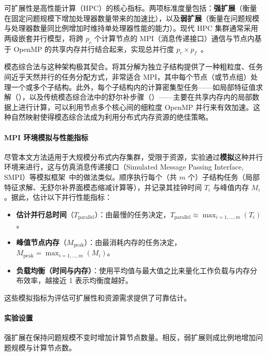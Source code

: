 可扩展性是高性能计算（HPC）的核心指标。两项标准度量包括：\textbf{强扩展}（衡量在固定问题规模下增加处理器数量带来的加速比）\cite{Rodgers1985Improvements}，以及\textbf{弱扩展}（衡量在问题规模与处理器数量同比例增加时维持单处理器性能的能力）\cite{Gustafson1988Reevaluating, McCool2012Performance}。现代 HPC 集群通常采用两级嵌套并行模型，将跨 $p_c$ 个计算节点的 MPI（消息传递接口）通信与节点内基于 OpenMP 的共享内存并行结合起来，实现总并行度 $p_c \times p_f$~\cite{2010LiHybridMPI/OpenMPPpower-awareCcomputing, rabenseifner2009hybrid, Jammer2022Towards, Cappello2000MPI}。

模态综合法与这种架构极其契合。将其分解为独立子结构提供了一种粗粒度、任务间近乎天然并行的任务分配方式，非常适合 MPI，其中每个节点（或节点组）处理一个或多个子结构。此外，每个子结构内的计算密集型任务——如局部特征值求解（），以及传统模态综合法中的舒尔补步骤（）——主要在共享内存内的局部数据上进行计算，可以利用节点多个核心间的细粒度 OpenMP 并行来有效加速。这种自然映射使得模态综合法成为利用分布式内存资源的绝佳策略。

\paragraph{MPI 环境模拟与性能指标}
尽管本文方法适用于大规模分布式内存集群，受限于资源，实验通过\textbf{模拟}这种并行环境来进行，这与仿真消息传递接口（Simulated Message Passing Interface, SMPI）等模拟框架~\cite{Degomme2017SMPI, Basu1990Model}中的做法类似。顺序执行每个（共 $m$ 个）子结构任务（局部特征求解、无舒尔补界面模态缩减计算等），并记录其挂钟时间 $T_i$ 与峰值内存 $M_i$。据此，估计以下并行性能指标：
\begin{itemize}
    \item \textbf{估计并行总时间}（$T_{\text{parallel}}$）：由最慢的任务决定，$T_{\text{parallel}} \approx \max_{i=1,\dots,m} (T_i)$。
    \item \textbf{峰值节点内存}（$M_{\text{peak}}$）：由最消耗内存的任务决定，$M_{\text{peak}} = \max_{i=1,\dots,m} (M_i)$。
    \item \textbf{负载均衡（时间与内存）}：使用平均值与最大值之比来量化工作负载与内存分布效率，越接近 1 表示均衡度越好。
\end{itemize}
这些模拟指标为评估可扩展性和资源需求提供了可靠估计。

\paragraph{实验设置}
强扩展在保持问题规模不变时增加计算节点数量。相反，弱扩展则成比例地增加问题规模与计算节点数。

